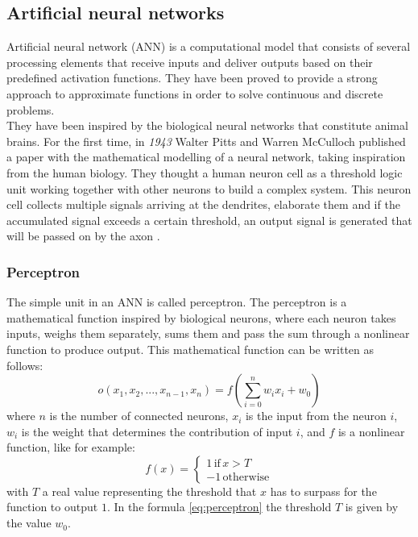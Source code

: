 \subsection{Artificial neural networks}
Artificial neural network (\gls{ANN}) is a computational model that consists of several processing elements that receive inputs and deliver outputs based on their predefined activation functions.
They have been proved to provide a strong approach to approximate functions in order to solve continuous and discrete problems. \\

They have been inspired by the biological neural networks that constitute animal brains. For the first time, in \emph{1943} Walter Pitts and Warren McCulloch published a paper with the mathematical modelling of a neural network, taking inspiration from the human biology. They thought a human neuron cell as a threshold logic unit working together with other neurons to build a complex system. This neuron cell collects multiple signals arriving at the dendrites, elaborate them and if the accumulated signal exceeds a certain threshold, an output signal is generated that will be passed on by the axon \cite{McCulloch1943}. %

\subsubsection{Perceptron}
The simple unit in an \gls{ANN} is called perceptron. The perceptron is a mathematical function inspired by biological neurons, where each neuron takes inputs, weighs them separately, sums them and pass the sum through a nonlinear function to produce output. This mathematical function can be written as follows:
\begin{equation} \label{eq:perceptron}
    o(x_1,x_2,...,x_{n-1}, x_n) = f(\sum_{i=0}^n w_i x_i + w_0)
\end{equation}
\noindent where $n$ is the number of connected neurons, $x_i$ is the input from the neuron $i$, $w_i$ is the weight that determines the contribution of input $i$, and $f$ is a nonlinear function, like for example: 
\begin{equation*}
  f(x) =
    \begin{cases}
      1 \, \text{if} \, x > T \\
      -1 \, \text{otherwise}
    \end{cases}       
\end{equation*}
\noindent with $T$ a real value representing the threshold that $x$ has to surpass for the function to output $1$. In the formula \ref{eq:perceptron} the threshold $T$ is given by the value $w_0$. \\

